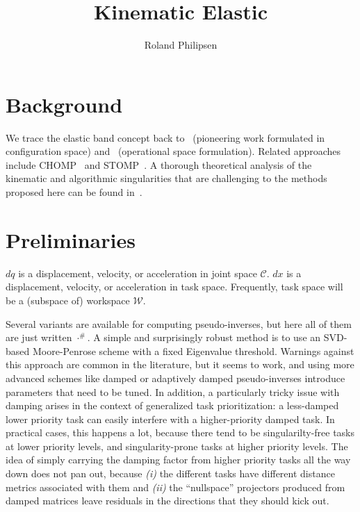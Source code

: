 \documentclass{article}
\begin{document}
\title{Kinematic Elastic}
\author{Roland Philipsen}
\maketitle



\section{Background}

We trace the elastic band concept back to~\cite{quinlan:1994} (pioneering work formulated in configuration space) and~\cite{brock:1999} (operational space formulation).
Related approaches include CHOMP~\cite{ratliff:2009} and STOMP~\cite{kalakrishnan:2011}.
A thorough theoretical analysis of the kinematic and algorithmic singularities that are challenging to the methods proposed here can be found in~\cite{chiaverini:1997}.



\section{Preliminaries}

$dq$ is a displacement, velocity, or acceleration in joint space $\mathcal{C}$.
$dx$ is a displacement, velocity, or acceleration in task space.
Frequently, task space will be a (subspace of) workspace $\mathcal{W}$.

Several variants are available for computing pseudo-inverses, but here all of them are just written $\cdot^\#$.
A simple and surprisingly robust method is to use an SVD-based Moore-Penrose scheme with a fixed Eigenvalue threshold.
Warnings against this approach are common in the literature, but it seems to work, and using more advanced schemes like damped or adaptively damped pseudo-inverses introduce parameters that need to be tuned.
In addition, a particularly tricky issue with damping arises in the context of generalized task prioritization:
a less-damped lower priority task can easily interfere with a higher-priority damped task.
In practical cases, this happens a lot, because there tend to be singularilty-free tasks at lower priority levels, and singularity-prone tasks at higher priority levels.
The idea of simply carrying the damping factor from higher priority tasks all the way down does not pan out, because \emph{(i)} the different tasks have different distance metrics associated with them and \emph{(ii)} the ``nullspace'' projectors produced from damped matrices leave residuals in the directions that they should kick out.
\end{document}
